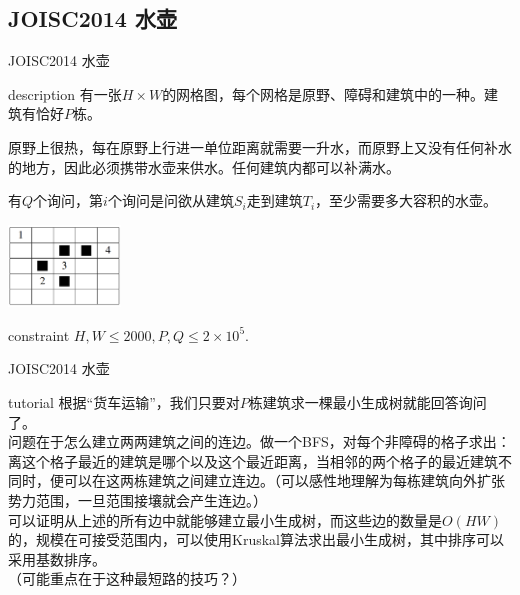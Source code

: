 \documentclass{beamer}
\begin{document}
\subsection{JOISC2014 水壶}
\begin{frame}{JOISC2014 水壶}
	\begin{block}{description}
		有一张$H \times W$的网格图，每个网格是原野、障碍和建筑中的一种。建筑有恰好$P$栋。
		
		原野上很热，每在原野上行进一单位距离就需要一升水，而原野上又没有任何补水的地方，因此必须携带水壶来供水。任何建筑内都可以补满水。
		
		有$Q$个询问，第$i$个询问是问欲从建筑$S_i$走到建筑$T_i$，至少需要多大容积的水壶。
		\begin{center}
			\includegraphics[width=3.0cm]{joisc2014.png}
		\end{center}
	\end{block}
	\begin{block}{constraint}
		$H, W \le 2000, P, Q \le 2 \times 10^5.$
	\end{block}
\end{frame}
\begin{frame}{JOISC2014 水壶}
	\begin{block}{tutorial}
		根据“货车运输”，我们只要对$P$栋建筑求一棵最小生成树就能回答询问了。\\
		
		问题在于怎么建立两两建筑之间的连边。做一个BFS，对每个非障碍的格子求出：离这个格子最近的建筑是哪个以及这个最近距离，当相邻的两个格子的最近建筑不同时，便可以在这两栋建筑之间建立连边。（可以感性地理解为每栋建筑向外扩张势力范围，一旦范围接壤就会产生连边。）\\
		
		可以证明从上述的所有边中就能够建立最小生成树，而这些边的数量是$O(HW)$的，规模在可接受范围内，可以使用Kruskal算法求出最小生成树，其中排序可以采用基数排序。\\
		
		（可能重点在于这种最短路的技巧？）
	\end{block}
\end{frame}
\end{document}
